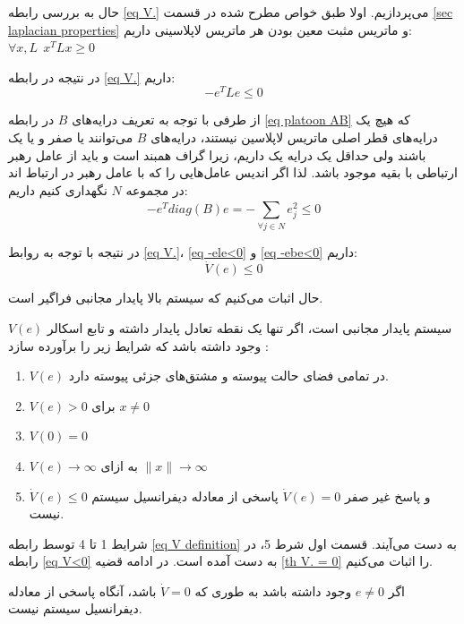 حال به بررسی رابطه \ref{eq V.} می‌پردازیم. اولا طبق خواص مطرح شده در قسمت \ref{sec laplacian properties} و ماتریس مثبت معین بودن هر ماتریس لاپلاسینی داریم:
$\forall x,L~~x^TLx \ge 0$
 
در نتیجه در رابطه \ref{eq V.} داریم:
\begin{equation}\label{eq -ele<0}
	-e^TLe \le 0
\end{equation}

از طرفی با توجه به تعریف درایه‌های $B$ در رابطه \ref{eq platoon AB} که هیچ‌ یک درایه‌های قطر اصلی ماتریس لاپلاسین نیستند، درایه‌های $B$ می‌توانند یا صفر و یا یک باشند ولی حداقل یک درایه یک داریم، زیرا گراف همبند است و باید از عامل رهبر ارتباطی با بقیه موجود باشد. لذا اگر اندیس عامل‌هایی را که با عامل رهبر در ارتباط اند در مجموعه $N$ نگهداری کنیم داریم:
\begin{equation}\label{eq -ebe<0}
	-e^Tdiag(B)e = -\sum_{\forall j \in N}^{}e^2_j \le 0
\end{equation}

در نتیجه با توجه به روابط \ref{eq V.}، \ref{eq -ele<0} و \ref{eq -ebe<0} داریم:
\begin{equation}\label{eq V<0}
	\dot{V}(e) \le 0
\end{equation}

حال اثبات می‌کنیم که سیستم بالا پایدار مجانبی فراگیر است.

\begin{theorem}\label{th g.a.stable}
سیستم پایدار مجانبی است، اگر تنها یک نقطه تعادل پایدار داشته و تابع اسکالر $V(e)$ وجود داشته باشد که شرایط زیر را برآورده سازد \cite{sedigh2003modern}:
\begin{enumerate}
	\item $V(e)$ در تمامی فضای حالت پیوسته و مشتق‌های جزئی پیوسته دارد.
	\item $V(e) > 0$ برای $x \ne 0$
	\item $V(0) = 0$
	\item $V(e) \to \infty$ به ازای $\|x\| \to \infty$
	\item $\dot{V}(e) \le 0$
و پاسخ غیر صفر 
$\dot{V}(e) = 0$
پاسخی از معادله دیفرانسیل سیستم نیست.
\end{enumerate}
\end{theorem}

شرایط 1 تا 4 توسط رابطه \ref{eq V definition} به دست می‌آیند. قسمت اول شرط 5، در رابطه \ref{eq V<0}
به دست آمده است. در ادامه قضیه \ref{th V. = 0} را اثبات می‌کنیم.

\begin{theorem}\label{th V. = 0}
اگر $e \ne 0$ وجود داشته باشد به طوری که $\dot{V} = 0$ باشد، آنگاه پاسخی از معادله دیفرانسیل سیستم نیست.

\end{theorem}

